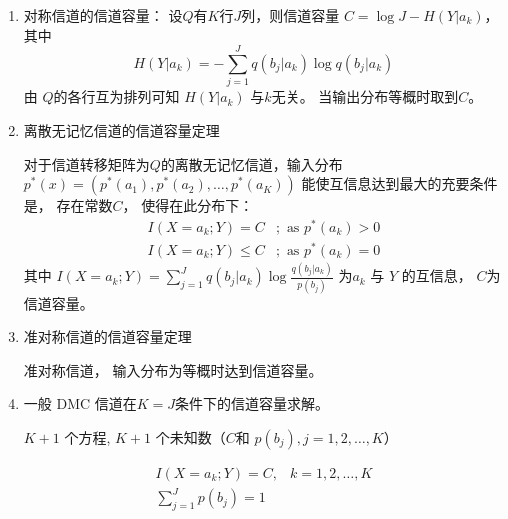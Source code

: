 \documentclass{article}
\begin{document}
\begin{enumerate}
\begin{enumerate}
\end{enumerate}
\item 对称信道的信道容量：
设$Q$有$K$行$J$列，则信道容量 $C = \log J - H(Y|a_k)$，其中 
$$
H(Y|a_k) = -\sum_{j=1}^J q(b_j | a_k) \log q(b_j | a_k)
$$
由 $Q$的各行互为排列可知 $H(Y|a_k)$ 与$k$无关。
当输出分布等概时取到$C$。
\item 离散无记忆信道的信道容量定理

对于信道转移矩阵为$Q$的离散无记忆信道，输入分布 $p^*(x) = (p^*(a_1), p^*(a_2), \dots, p^*(a_K))$ 能使互信息达到最大的充要条件是， 存在常数$C$， 使得在此分布下：
\begin{align*}
    I(X = a_k; Y) = C & ; \text{ as } p^*(a_k) > 0 \\
    I(X = a_k; Y) \leq C & ; \text{ as } p^*(a_k) = 0 
\end{align*}
其中 $I(X = a_k; Y) = \sum_{j=1}^J q(b_j | a_k) \log \frac{q(b_j | a_k)}{p(b_j)}$ 为$ a_k$ 与 $Y$ 的互信息， $C$为信道容量。

\item 准对称信道的信道容量定理

准对称信道， 输入分布为等概时达到信道容量。

\item 一般 DMC 信道在$K = J$条件下的信道容量求解。

$K+1$ 个方程, $K+1$ 个未知数（$C$和 $p(b_j), j = 1, 2, \dots, K$）

\begin{align}
\label{eq:IC}    I(X = a_k; Y) = C, & k = 1, 2, \dots, K \\
\label{eq:normalization}   \sum_{j=1}^J p(b_j) = 1 &
\end{align}


\end{enumerate}
\end{document}

